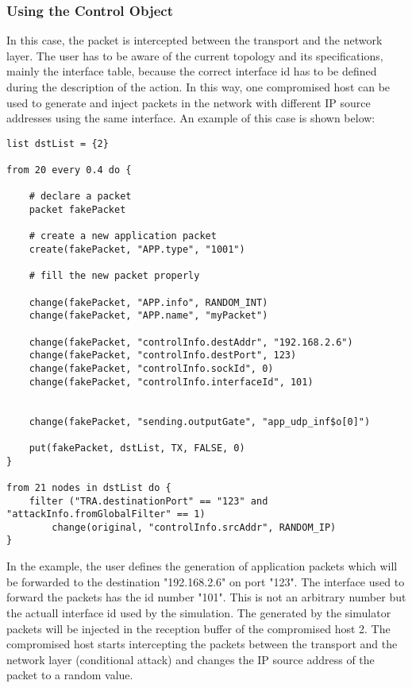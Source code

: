\subsubsection{Using the Control Object}
In this case, the packet is intercepted between the transport and the network layer. The user has to be aware of the current topology and its specifications, mainly the interface table, because the correct interface id has to be defined during the description of the action. In this way, one compromised host can be used to generate and inject packets in the network with different IP source addresses using the same interface. An example of this case is shown below:
\begin{lstlisting}[language={asl}, caption={Assign random IP source address on control object}]
list dstList = {2}

from 20 every 0.4 do {

	# declare a packet
	packet fakePacket
    
	# create a new application packet
	create(fakePacket, "APP.type", "1001") 

	# fill the new packet properly
	
	change(fakePacket, "APP.info", RANDOM_INT)
	change(fakePacket, "APP.name", "myPacket")
	
	change(fakePacket, "controlInfo.destAddr", "192.168.2.6")
	change(fakePacket, "controlInfo.destPort", 123)
	change(fakePacket, "controlInfo.sockId", 0)
	change(fakePacket, "controlInfo.interfaceId", 101)

	
	change(fakePacket, "sending.outputGate", "app_udp_inf$o[0]")
	
	put(fakePacket, dstList, TX, FALSE, 0)
} 

from 21 nodes in dstList do {
	filter ("TRA.destinationPort" == "123" and "attackInfo.fromGlobalFilter" == 1)
		change(original, "controlInfo.srcAddr", RANDOM_IP)
}
\end{lstlisting}

In the example, the user defines the generation of application packets which will be forwarded to the destination "192.168.2.6" on port "123". The interface used to forward the packets has the id number "101". This is not an arbitrary number but the actuall interface id used by the simulation. The generated by the simulator packets will be injected in the reception buffer of the compromised host 2. The compromised host starts intercepting the packets between the transport and the network layer (conditional attack) and changes the IP source address of the packet to a random value.

